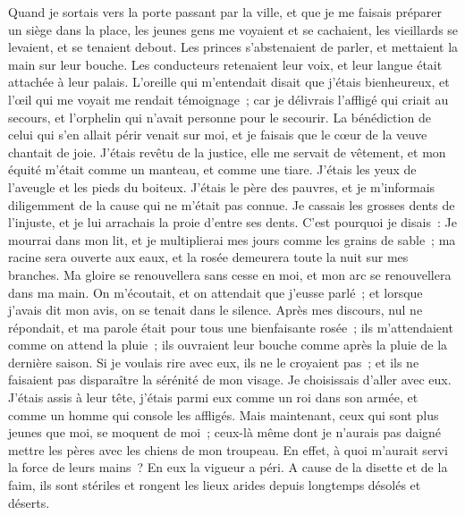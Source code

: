 \begin{multicols}{2}
Quand je sortais vers la porte passant par la ville, et que je me faisais préparer un siège dans la place,
les jeunes gens me voyaient et se cachaient, les vieillards se levaient, et se tenaient debout.
Les princes s'abstenaient de parler, et mettaient la main sur leur bouche.
Les conducteurs retenaient leur voix, et leur langue était attachée à leur palais.
L'oreille qui m'entendait disait que j'étais bienheureux, et l'œil qui me voyait me rendait témoignage~;
car je délivrais l'affligé qui criait au secours, et l'orphelin qui n'avait personne pour le secourir.
La bénédiction de celui qui s'en allait périr venait sur moi, et je faisais que le cœur de la veuve chantait de joie.
J'étais revêtu de la justice, elle me servait de vêtement, et mon équité m'était comme un manteau, et comme une tiare.
J'étais les yeux de l'aveugle et les pieds du boiteux.
J'étais le père des pauvres, et je m'informais diligemment de la cause qui ne m'était pas connue.
Je cassais les grosses dents de l'injuste, et je lui arrachais la proie d'entre ses dents.
C'est pourquoi je disais~: Je mourrai dans mon lit, et je multiplierai mes jours comme les grains de sable~;
ma racine sera ouverte aux eaux, et la rosée demeurera toute la nuit sur mes branches.
Ma gloire se renouvellera sans cesse en moi, et mon arc se renouvellera dans ma main.
On m'écoutait, et on attendait que j'eusse parlé~; et lorsque j'avais dit mon avis, on se tenait dans le silence.
Après mes discours, nul ne répondait, et ma parole était pour tous une bienfaisante rosée~;
ils m'attendaient comme on attend la pluie~; ils ouvraient leur bouche comme après la pluie de la dernière saison.
Si je voulais rire avec eux, ils ne le croyaient pas~; et ils ne faisaient pas disparaître la sérénité de mon visage.
Je choisissais d'aller avec eux. J'étais assis à leur tête, j'étais parmi eux comme un roi dans son armée, et comme un homme qui console les affligés.
\VerseOne{}Mais maintenant, ceux qui sont plus jeunes que moi, se moquent de moi~; ceux-là même dont je n'aurais pas daigné mettre les pères avec les chiens de mon troupeau.
 En effet, à quoi m'aurait servi la force de leurs mains~? En eux la vigueur a péri.
A cause de la disette et de la faim, ils sont stériles et rongent les lieux arides depuis longtemps désolés et déserts.

\end{multicols}
